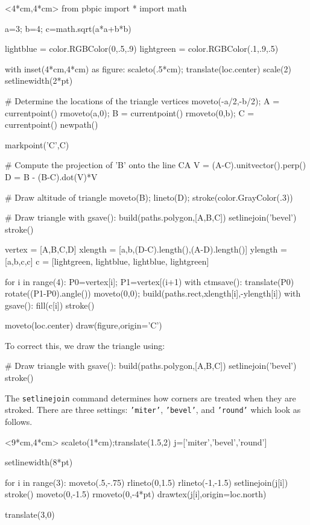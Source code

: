 \documentclass[12pt]{article}
\def\code#1{{\tt #1}}
\begin{document}
\hfil\begin{pbpic}<4*cm,4*cm>
from pbpic import *
import math

a=3; b=4; c=math.sqrt(a*a+b*b)

lightblue = color.RGBColor(0,.5,.9)
lightgreen = color.RGBColor(.1,.9,.5)

with inset(4*cm,4*cm) as figure:
  scaleto(.5*cm); translate(loc.center)
  scale(2)
  setlinewidth(2*pt)

  # Determine the locations of the triangle vertices
  moveto(-a/2,-b/2); A = currentpoint()
  rmoveto(a,0); B = currentpoint()
  rmoveto(0,b); C = currentpoint()
  newpath()

  markpoint('C',C)

  # Compute the projection of 'B' onto the line CA
  V = (A-C).unitvector().perp()
  D = B - (B-C).dot(V)*V

  # Draw altitude of triangle
  moveto(B); lineto(D);
  stroke(color.GrayColor(.3))

  # Draw triangle
  with gsave():
    build(paths.polygon,[A,B,C])
    setlinejoin('bevel')
    stroke()

  vertex = [A,B,C,D]
  xlength = [a,b,(D-C).length(),(A-D).length()]
  ylength = [a,b,c,c]
  c = [lightgreen, lightblue, lightblue, lightgreen]

  for i in range(4):
    P0=vertex[i]; P1=vertex[(i+1)%
    with ctmsave():
      translate(P0)
      rotate((P1-P0).angle())
      moveto(0,0);
      build(paths.rect,xlength[i],-ylength[i])
    with gsave():
      fill(c[i])
    stroke()

moveto(loc.center)
draw(figure,origin='C')

\end{pbpic}

To correct this, we draw the triangle using:
\begin{snippet}
# Draw triangle
with gsave():
  build(paths.polygon,[A,B,C])
  setlinejoin('bevel')
  stroke()
\end{snippet}
The \code{setlinejoin} command determines how corners are treated 
when they are stroked.  There are three settings: \code{'miter'},
\code{'bevel'}, and \code{'round'} which look as follows.

\hfil\begin{pbpic}<9*cm,4*cm>
scaleto(1*cm);translate(1.5,2)
j=['miter','bevel','round']

setlinewidth(8*pt)

for i in range(3):
  moveto(.5,-.75)
  rlineto(0,1.5)
  rlineto(-1,-1.5)
  setlinejoin(j[i])
  stroke()
  moveto(0,-1.5)
  rmoveto(0,-4*pt)
  drawtex(j[i],origin=loc.north)
  
  translate(3,0)
\end{pbpic}
\end{document}
